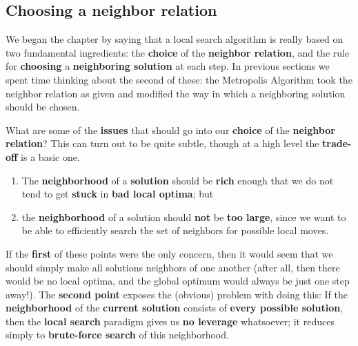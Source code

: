 




\subsection{Choosing a neighbor relation}
We began the chapter by saying that a local search algorithm is really based on two fundamental ingredients: the \textbf{choice} of the \textbf{neighbor relation}, and the rule for \textbf{choosing} a \textbf{neighboring solution} at each step. In previous sections we spent time thinking about the second of these: the Metropolis Algorithm took the neighbor relation as given and modified the way in which a neighboring solution should be chosen. 

What are some of the \textbf{issues} that should go into our \textbf{choice} of the \textbf{neighbor relation}? This can turn out to be quite subtle, though at a high level the \textbf{trade-off} is a basic one.

\begin{enumerate}
    \item The \textbf{neighborhood} of a \textbf{solution} should be \textbf{rich} enough that we do not tend to get \textbf{stuck} in \textbf{bad local optima}; but
    \item the \textbf{neighborhood} of a solution should \textbf{not} be \textbf{too large}, since we want to be able to efficiently search the set of neighbors for possible local moves.
\end{enumerate}

If the \textbf{first} of these points were the only concern, then it would seem that we should simply make all solutions neighbors of one another (after all, then there would be no local optima, and the global optimum would always be just one step away!). The \textbf{second point} exposes the (obvious) problem with doing this: If the \textbf{neighborhood} of the \textbf{current solution} consists of \textbf{every possible solution}, then the \textbf{local search} paradigm gives us \textbf{no leverage} whatsoever; it reduces simply to \textbf{brute-force search} of this neighborhood.

